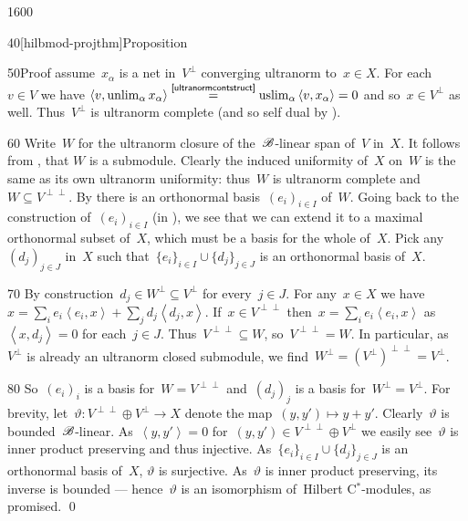 \begin{parsec}{1600}
\begin{point}{40}[hilbmod-projthm]{Proposition}
\begin{point}{50}{Proof}
    assume~$x_\alpha$ is a net in~$V^\perp$
    converging ultranorm to~$x \in X$.
For each~$v \in V$ we have
$ \left<v, \unlim_\alpha x_\alpha\right>
    \overset{\sref{ultranormcontstruct}}{=}
    \uslim_\alpha \left<v, x_\alpha\right>  = 0 $
    and so~$x \in V^\perp$ as well.
Thus~$V^\perp$ is ultranorm complete
    (and so self dual by ).
\begin{point}{60}%
Write~$W$ for the ultranorm closure of
    the~$\mathscr{B}$-linear span of~$V$ in~$X$.
It follows from , that $W$ is a submodule.
Clearly the induced uniformity of~$X$
    on~$W$ is the same as its own ultranorm uniformity:
    thus~$W$ is ultranorm complete
        and~$W \subseteq V^{\perp\perp}$.
By  there
    is an orthonormal basis~$(e_i)_{i \in I}$ of~$W$.
Going back to the construction of~$(e_i)_{i \in I}$
    (in ),
    we see that we can extend it to a maximal orthonormal subset of~$X$,
    which must be a basis for the whole of~$X$.
Pick any~$(d_j)_{j \in J} $ in~$X$
    such that~$\{e_i\}_{i \in I} \cup \{d_j\}_{j \in J}$
    is an orthonormal basis of~$X$.
\end{point}
\begin{point}{70}%
By construction~$d_j \in W^\perp \subseteq V^\perp$
    for every~$j \in J$.
For any~$x \in X$
    we have~$x = \sum_i e_i \left<e_i, x\right>
                + \sum_j d_j \left<d_j,x\right>$.
If~$x \in V^{\perp\perp}$
    then~$x = \sum_i e_i \left<e_i, x\right>$
    as~$\left<x, d_j\right>= 0$ for each~$j \in J$.
Thus~$V^{\perp\perp} \subseteq W$, so~$V^{\perp\perp} = W$.
In particular, as~$V^\perp$ is already an ultranorm closed submodule,
    we find~$W^\perp = (V^\perp)^{\perp\perp} = V^\perp$.
\end{point}
\begin{point}{80}%
So~$(e_i)_i$ is a basis for~$W = V^{\perp\perp}$
    and~$(d_j)_j$ is a basis for~$W^\perp = V^\perp$.
For brevity, let~$\vartheta\colon V^{\perp\perp} \oplus V^\perp \to X$
    denote the map~$(y,y') \mapsto y+y'$.
Clearly~$\vartheta$ is bounded~$\mathscr{B}$-linear.
As~$\left<y,y'\right> = 0$ for~$(y,y') \in V^{\perp\perp} \oplus V^\perp$
    we easily see~$\vartheta$ is inner product preserving and thus injective.
As~$\{e_i\}_{i \in I} \cup \{d_j\}_{j \in J}$
    is an orthonormal basis of~$X$, $\vartheta$ is surjective.
As~$\vartheta$ is inner product preserving, its inverse is bounded
    --- hence~$\vartheta$ is an isomorphism of~Hilbert C$^*$-modules,
    as promised.
    \qed
\end{point}

\end{point}
\end{point}
\end{parsec}

